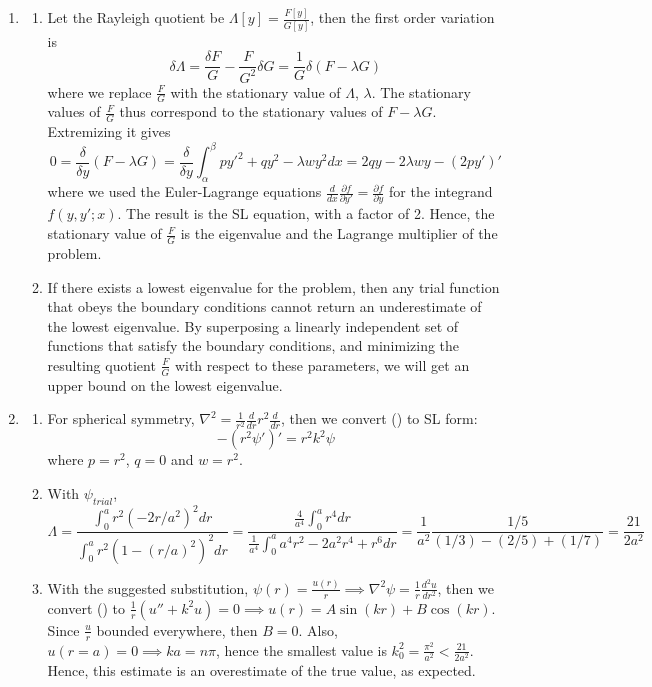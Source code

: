 \documentclass[a4paper]{article}
\begin{document}
\begin{ans}\leavevmode
\begin{enumerate}[label=(\alph*)]
\item
\begin{enumerate}[label=(\roman*)]
\item Let the Rayleigh quotient be $\Lambda[y]=\frac{F[y]}{G[y]}$, then the first order variation is
$$\delta\Lambda=\frac{\delta F}{G}-\frac{F}{G^2}\delta G=\frac{1}{G}\delta(F-\lambda G)$$
where we replace $\frac{F}{G}$ with the stationary value of $\Lambda$, $\lambda$. The stationary values of $\frac{F}{G}$ thus correspond to the stationary values of $F-\lambda G$. Extremizing it gives
$$0=\frac{\delta}{\delta y}(F-\lambda G)=\frac{\delta}{\delta y}\int_\alpha^\beta py'^2+qy^2-\lambda wy^2dx=2qy-2\lambda wy-(2py')'$$
where we used the Euler-Lagrange equations $\frac{d}{dx}\frac{\partial f}{\partial y'}=\frac{\partial f}{\partial y}$ for the integrand $f(y,y';x)$. The result is the SL equation, with a factor of 2. Hence, the stationary value of $\frac{F}{G}$ is the eigenvalue and the Lagrange multiplier of the problem.
\item If there exists a lowest eigenvalue for the problem, then any trial function that obeys the boundary conditions cannot return an underestimate of the lowest eigenvalue. By superposing a linearly independent set of functions that satisfy the boundary conditions, and minimizing the resulting quotient $\frac{F}{G}$ with respect to these parameters, we will get an upper bound on the lowest eigenvalue.
\end{enumerate}
\item
\begin{enumerate}[label=(\roman*)]
\item For spherical symmetry, $\nabla^2=\frac{1}{r^2}\frac{d}{dr}r^2\frac{d}{dr}$, then we convert (\dag) to SL form:
$$-(r^2\psi')'=r^2k^2\psi$$
where $p=r^2$, $q=0$ and $w=r^2$.
\item With $\psi_{trial}$,
$$\Lambda=\frac{\int_0^a r^2(-2r/a^2)^2dr}{\int_0^ar^2(1-(r/a)^2)^2dr}=\frac{\frac{4}{a^4}\int_0^ar^4dr}{\frac{1}{a^4}\int_0^aa^4r^2-2a^2r^4+r^6dr}=\frac{1}{a^2}\frac{1/5}{(1/3)-(2/5)+(1/7)}=\frac{21}{2a^2}$$
\item With the suggested substitution, $\psi(r)=\frac{u(r)}{r}\implies\nabla^2\psi=\frac{1}{r}\frac{d^2u}{dr^2}$, then we convert (\dag) to $\frac{1}{r}(u''+k^2u)=0\implies u(r)=A\sin(kr)+B\cos(kr)$. Since $\frac{u}{r}$ bounded everywhere, then $B=0$. Also, $u(r=a)=0\implies ka=n\pi$, hence the smallest value is $k_0^2=\frac{\pi^2}{a^2}<\frac{21}{2a^2}$. Hence, this estimate is an overestimate of the true value, as expected.
\end{enumerate}
\end{enumerate}
\end{ans}
\newpage
\end{document}
